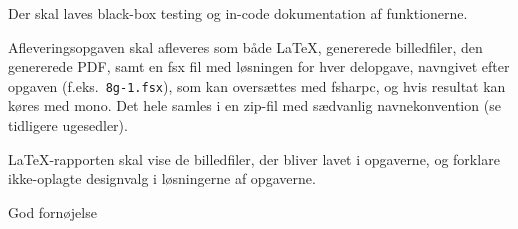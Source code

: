 \documentclass[a4paper,12pt]{article}
\begin{document}
\noindent
Der skal laves black-box testing og in-code dokumentation af
funktionerne.

\vspace{1ex}

\noindent
Afleveringsopgaven skal afleveres som både \LaTeX, genererede
billedfiler, den genererede PDF, samt en fsx fil med løsningen for
hver delopgave, navngivet efter opgaven (f.eks.\ \texttt{8g-1.fsx}),
som kan oversættes med fsharpc, og hvis resultat kan køres med mono.
Det hele samles i en zip-fil med sædvanlig navnekonvention (se
tidligere ugesedler).

\LaTeX-rapporten skal vise de billedfiler, der bliver lavet i
opgaverne, og forklare ikke-oplagte designvalg i løsningerne af
opgaverne.

\vspace{1ex}

\hfill God fornøjelse
\end{document}
